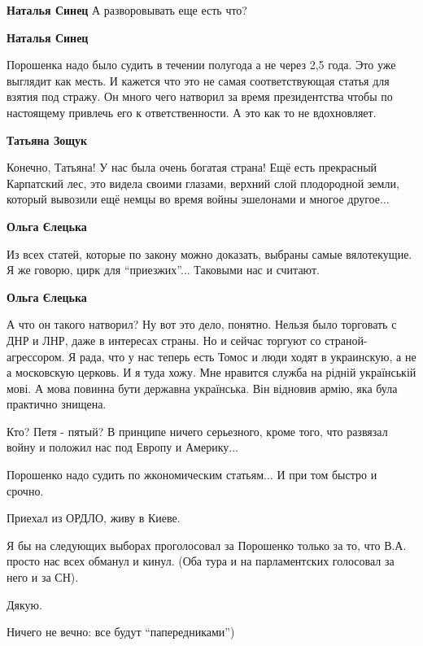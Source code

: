 \begin{itemize}
\begin{itemize} %
\textbf{Наталья Синец} А разворовывать еще есть что?

\textbf{Наталья Синец} 

Порошенка надо было судить в течении полугода а не через 2,5 года. Это уже
выглядит как месть. И кажется что это не самая соответствующая статья для
взятия под стражу. Он много чего натворил за время президентства чтобы по
настоящему привлечь его к ответственности. А это как то не вдохновляет.

\textbf{Татьяна Зощук} 

Конечно, Татьяна! У нас была очень богатая страна! Ещё есть прекрасный
Карпатский лес, это видела своими глазами, верхний слой плодородной земли,
который вывозили ещё немцы во время войны эшелонами и многое другое...

\textbf{Ольга Єлецька} 

Из всех статей, которые по закону можно доказать, выбраны самые вялотекущие. Я
же говорю, цирк для \enquote{приезжих}... Таковыми нас и считают.

\textbf{Ольга Єлецька} 

А что он такого натворил? Ну вот это дело, понятно. Нельзя было торговать с ДНР
и ЛНР, даже в интересах страны. Но и сейчас торгуют со страной-агрессором. Я
рада, что у нас теперь есть Томос и люди ходят в украинскую, а не а московскую
церковь. И я туда хожу. Мне нравится служба на рідній українській мові. А мова
повинна бути державна українська. Він відновив армію, яка була практично
знищена.


Кто? Петя - пятый? В принципе ничего серьезного, кроме того, что развязал войну
и положил нас под Европу и Америку...

\end{itemize} %

Порошенко надо судить по жкономическим статьям... И при том быстро и срочно.


Приехал из ОРДЛО, живу в Киеве.

Я бы на следующих выборах проголосовал за Порошенко только за то, что В.А.
просто нас всех обманул и кинул. (Оба тура и на парламентских голосовал за него
и за СН).

Дякую.


Ничего не вечно: все будут \enquote{папередниками})


\end{itemize}
